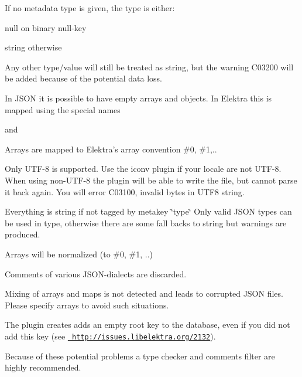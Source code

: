 If no metadata {\ttfamily type} is given, the type is either\+:


\begin{DoxyItemize}
\item {\ttfamily null} on binary null-\/key
\item {\ttfamily string} otherwise
\end{DoxyItemize}

Any other type/value will still be treated as string, but the warning {\ttfamily C03200} will be added because of the potential data loss.

In J\+S\+ON it is possible to have empty arrays and objects. In Elektra this is mapped using the special names


\begin{DoxyCode}{0}
\end{DoxyCode}


and


\begin{DoxyCode}{0}
\end{DoxyCode}


Arrays are mapped to Elektra’s array convention \#0, \#1,..


\begin{DoxyItemize}
\item Only U\+T\+F-\/8 is supported. Use the {\ttfamily iconv} plugin if your locale are not U\+T\+F-\/8. When using non-\/\+U\+T\+F-\/8 the plugin will be able to write the file, but cannot parse it back again. You will error C03100, invalid bytes in U\+T\+F8 string.
\item Everything is string if not tagged by metakey \char`\"{}type\char`\"{} Only valid J\+S\+ON types can be used in type, otherwise there are some fall backs to string but warnings are produced.
\item Arrays will be normalized (to \#0, \#1, ..)
\item Comments of various J\+S\+O\+N-\/dialects are discarded.
\item Mixing of arrays and maps is not detected and leads to corrupted J\+S\+ON files. Please specify arrays to avoid such situations.
\item The plugin creates adds an empty root key to the database, even if you did not add this key (see \href{http://issues.libelektra.org/2132}{\texttt{ http\+://issues.\+libelektra.\+org/2132}}).
\end{DoxyItemize}

Because of these potential problems a type checker and comments filter are highly recommended.

